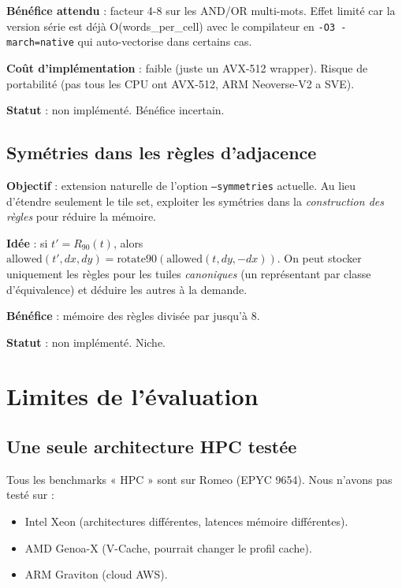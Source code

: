 \textbf{Bénéfice attendu} : facteur 4-8 sur les AND/OR multi-mots. Effet limité car la version série est déjà O(words\_per\_cell) avec le compilateur en \texttt{-O3 -march=native} qui auto-vectorise dans certains cas.

\textbf{Coût d'implémentation} : faible (juste un AVX-512 wrapper). Risque de portabilité (pas tous les CPU ont AVX-512, ARM Neoverse-V2 a SVE).

\textbf{Statut} : non implémenté. Bénéfice incertain.

\subsection{Symétries dans les règles d'adjacence}

\textbf{Objectif} : extension naturelle de l'option \texttt{--symmetries} actuelle. Au lieu d'étendre seulement le tile set, exploiter les symétries dans la \textit{construction des règles} pour réduire la mémoire.

\textbf{Idée} : si $t' = R_{90}(t)$, alors $\text{allowed}(t', dx, dy) = \text{rotate90}(\text{allowed}(t, dy, -dx))$. On peut stocker uniquement les règles pour les tuiles \textit{canoniques} (un représentant par classe d'équivalence) et déduire les autres à la demande.

\textbf{Bénéfice} : mémoire des règles divisée par jusqu'à 8.

\textbf{Statut} : non implémenté. Niche.

\section{Limites de l'évaluation}
\label{sec:limites:evaluation}

\subsection{Une seule architecture HPC testée}

Tous les benchmarks « HPC » sont sur Romeo (EPYC 9654). Nous n'avons pas testé sur :
\begin{itemize}
    \item Intel Xeon (architectures différentes, latences mémoire différentes).
    \item AMD Genoa-X (V-Cache, pourrait changer le profil cache).
    \item ARM Graviton (cloud AWS).
\end{itemize}

